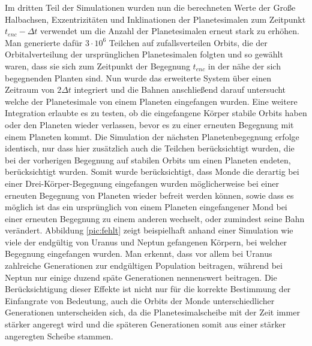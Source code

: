 \documentclass[10pt,a4paper,twoside]{article}
\begin{document}
Im dritten Teil der Simulationen wurden nun die berechneten Werte der Große Halbachsen, Exzentrizitäten und Inklinationen der Planetesimalen zum Zeitpunkt $t_{enc}-\Delta t$ verwendet um die Anzahl der Planetesimalen erneut stark zu erhöhen. Man generierte dafür $3 \cdot 10^6$ Teilchen auf zufallsverteilen Orbits, die der Orbitalverteilung der ursprünglichen Planetesimalen folgten und so gewählt waren, dass sie sich zum Zeitpunkt der Begegnung $t_{enc}$ in der nähe der sich begegnenden Planten sind. %
Nun wurde das erweiterte System über einen Zeitraum von $2 \Delta t$ integriert und die Bahnen anschließend darauf untersucht welche der Planetesimale von einem Planeten eingefangen wurden. %
Eine weitere Integration erlaubte es zu testen, ob die eingefangene Körper stabile Orbits haben oder den Planeten wieder verlassen, bevor es zu einer erneuten Begegnung mit einem Planeten kommt.
Die Simulation der nächsten Planetenbegegnung erfolge identisch, nur dass hier zusätzlich auch die Teilchen berücksichtigt wurden, die bei der vorherigen Begegnung auf stabilen Orbits um einen Planeten endeten, berücksichtigt wurden.
Somit wurde berücksichtigt, dass Monde die derartig bei einer Drei-Körper-Begegnung eingefangen wurden möglicherweise bei einer erneuten Begegnung von Planeten wieder befreit werden können, sowie dass es möglich ist das ein ursprünglich von einem Planeten eingefangener Mond bei einer erneuten Begegnung zu einem anderen wechselt, oder zumindest seine Bahn verändert\cite{Nesvorny2007}. %
Abbildung \ref{pic:fehlt} zeigt beispielhaft anhand einer Simulation wie viele der endgültig von Uranus und Neptun gefangenen Körpern, bei welcher Begegnung eingefangen wurden.
Man erkennt, dass vor allem bei Uranus zahlreiche Generationen zur endgültigen Population beitragen, während bei Neptun nur einige duzend späte Generationen nennenswert beitragen.
Die Berücksichtigung dieser Effekte ist nicht nur für die korrekte Bestimmung der Einfangrate von Bedeutung, auch die Orbits der Monde unterschiedlicher Generationen unterscheiden sich, da die Planetesimalscheibe mit der Zeit immer stärker angeregt wird und die späteren Generationen somit aus einer stärker angeregten Scheibe stammen\cite{Nesvorny2007}.
\end{document}

